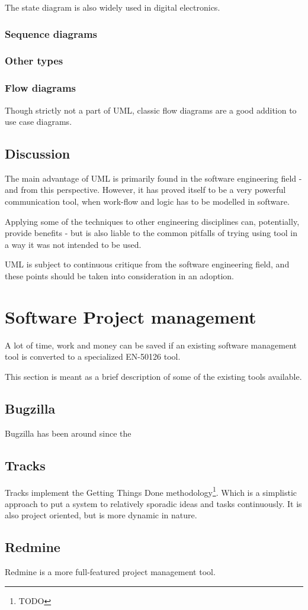 \documentclass[10pt,a4paper]{article}
\begin{document}
The state diagram is also widely used in digital electronics.


\subsubsection{Sequence diagrams}

\subsubsection{Other types}


\subsubsection*{Flow diagrams}
Though strictly not a part of UML, classic flow diagrams are a good addition to use case diagrams.


\subsection{Discussion}
The main advantage of UML is primarily found in the software engineering field - and from this perspective. However, it has proved itself to be a very powerful communication tool, when work-flow and logic has to be modelled in software.

Applying some of the techniques to other engineering disciplines can, potentially, provide benefits - but is also liable to the common pitfalls of trying using tool in a way it was not intended to be used.

UML is subject to continuous critique from the software engineering field, and these points should be taken into consideration in an adoption.

\section{Software Project management}
A lot of time, work and money can be saved if an existing software management tool is converted to a specialized EN-50126 tool.

This section is meant as a brief description of some of the existing tools available.
\subsection{Bugzilla}
Bugzilla has been around since the 

\subsection{Tracks}
Tracks implement the Getting Things Done methodology\footnote{TODO}. Which is a simplistic approach to put a system to relatively sporadic ideas and tasks continuously. It is also project oriented, but is more dynamic in nature.

\subsection{Redmine}
Redmine is a more full-featured project management tool.
\end{document}
